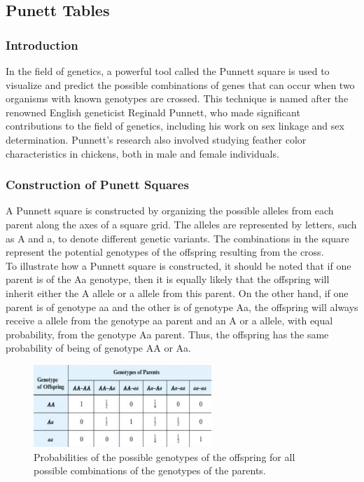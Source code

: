\documentclass[a4paper,12pt]{article}
\begin{document}
\subsection{Punett Tables}
\subsubsection{Introduction}
In the field of genetics, a powerful tool called the Punnett square is used to visualize and predict the possible combinations of genes that can occur when two organisms with known genotypes are crossed. This technique is named after the renowned English geneticist Reginald Punnett, who made significant contributions to the field of genetics, including his work on sex linkage and sex determination. Punnett's research also involved studying feather color characteristics in chickens, both in male and female individuals.
\subsubsection{Construction of Punett Squares}
A Punnett square is constructed by organizing the possible alleles from each parent along the axes of a square grid. The alleles are represented by letters, such as A and a, to denote different genetic variants. The combinations in the square represent the potential genotypes of the offspring resulting from the cross.\ \\
To illustrate how a Punnett square is constructed, it should be noted that if one parent is of the Aa genotype, then it is equally likely that the offspring will inherit either the A allele or a allele from this parent. On the other hand, if one parent is of genotype aa and the other is of genotype Aa, the offspring will always receive a allele from the genotype aa parent and an A or a allele, with equal probability, from the genotype Aa parent. Thus, the offspring has the same probability of being of genotype AA or Aa.
\begin{figure}[h]
\centering
\includegraphics[width=0.6\textwidth]{image2.png}
\caption{Probabilities of the possible genotypes of the offspring for all possible combinations of the genotypes of the parents.}
\label{fig:Punett-table}
\end{figure}
\end{document}
